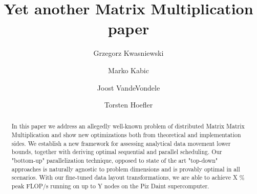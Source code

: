 \documentclass[sigconf]{acmart}
\begin{document}
	\title{Yet another Matrix Multiplication paper}
		
	\author{Grzegorz Kwasniewski}
	
			\author{Marko Kabic}
	
			\author{Joost VandeVondele}
	
		\author{Torsten Hoefler}
	
	\begin{abstract}
In this paper we address an allegedly well-known problem of distributed Matrix 
Matrix Multiplication and show new optimizations both from theoretical and 
implementation sides. We establish a new framework for 
assessing 
analytical data movement lower bounds, together with deriving optimal 
sequential and parallel scheduling. Our "bottom-up" parallelization technique, 
opposed to state of the art "top-down" approaches is naturally agnostic to 
problem dimensions and is provably optimal in all scenarios. With our 
fine-tuned data layout 
transformations, we are able to achieve X \% peak FLOP/s running on up to Y 
nodes on the Piz Daint supercomputer.
	\end{abstract}



\maketitle

	
\end{document}
